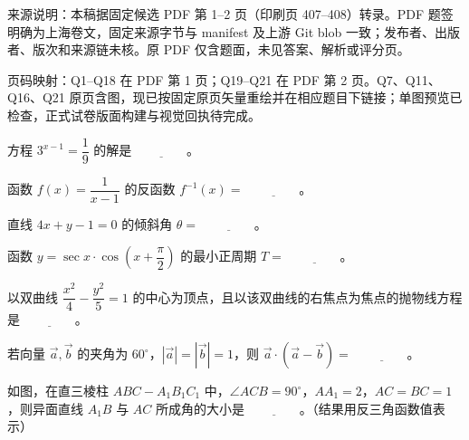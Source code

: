 

\begin{gktip}
来源说明：本稿据固定候选 PDF 第 1–2 页（印刷页 407–408）转录。PDF 题签明确为上海卷文，固定来源字节与 manifest 及上游 Git blob 一致；发布者、出版者、版次和来源链未核。原 PDF 仅含题面，未见答案、解析或评分页。

页码映射：Q1–Q18 在 PDF 第 1 页；Q19–Q21 在 PDF 第 2 页。Q7、Q11、Q16、Q21 原页含图，现已按固定原页矢量重绘并在相应题目下链接；单图预览已检查，正式试卷版面构建与视觉回执待完成。
\end{gktip}


\begin{question}
方程 $3^{x-1}=\dfrac{1}{9}$ 的解是 $\underline{\qquad\qquad}$。

\end{question}
\begin{question}
函数 $f(x)=\dfrac{1}{x-1}$ 的反函数 $f^{-1}(x)=$ $\underline{\qquad\qquad}$。

\end{question}
\begin{question}
直线 $4x+y-1=0$ 的倾斜角 $\theta=$ $\underline{\qquad\qquad}$。

\end{question}
\begin{question}
函数 $y=\sec x\cdot\cos\left(x+\dfrac{\pi}{2}\right)$ 的最小正周期 $T=$ $\underline{\qquad\qquad}$。

\end{question}
\begin{question}
以双曲线 $\dfrac{x^2}{4}-\dfrac{y^2}{5}=1$ 的中心为顶点，且以该双曲线的右焦点为焦点的抛物线方程是 $\underline{\qquad\qquad}$。

\end{question}
\begin{question}
若向量 $\vec{a},\vec{b}$ 的夹角为 $60^\circ$，$|\vec{a}|=|\vec{b}|=1$，则 $\vec{a}\cdot(\vec{a}-\vec{b})=$ $\underline{\qquad\qquad}$。

\Needspace{0.4\textheight}
\end{question}
\begin{question}
如图，在直三棱柱 $ABC-A_1B_1C_1$ 中，$\angle ACB=90^\circ$，$AA_1=2$，$AC=BC=1$，则异面直线 $A_1B$ 与 $AC$ 所成角的大小是 $\underline{\qquad\qquad}$。（结果用反三角函数值表示）
\nopagebreak[4]
\begin{center}\end{center}
\nopagebreak[4]
\end{question}
